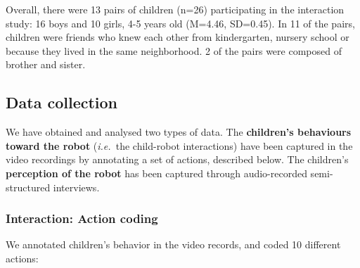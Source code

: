 \documentclass{sig-alternate}
\newcommand{\ie}{{\textit{i.e.~}}}
\begin{document}
Overall, there were 13 pairs of children (n=26) participating in the interaction
study: 16 boys and 10 girls, 4-5 years old (M=4.46, SD=0.45). In 11 of the
pairs, children were friends who knew each other from kindergarten, nursery
school or because they lived in the same neighborhood. 2 of the pairs were
composed of brother and sister.



\subsection{Data collection}


We have obtained and analysed two types of data. The \textbf{children's
behaviours toward the robot} (\ie the child-robot interactions) have been
captured in the video recordings by annotating a set of actions, described
below. The children's \textbf{perception of the
robot} has been captured through audio-recorded semi-structured interviews. 


\subsubsection{Interaction: Action coding}

We annotated children's behavior in the video records, and coded 10 different
actions:
\end{document}
